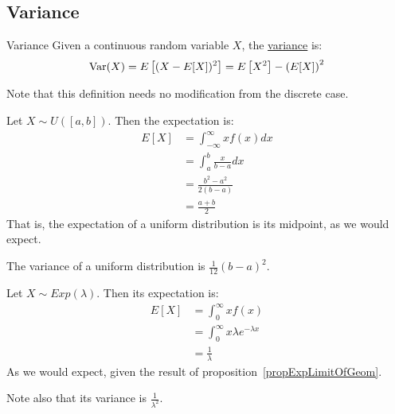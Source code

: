 \documentclass[../Main.tex]{subfiles}
\begin{document}
\subsection{Variance}
\begin{definition}{Variance}
    Given a continuous random variable $X$, the \underline{variance} is:
    \begin{equation*}
        \operatorname{Var}(X) = E\left[(X - E[X])^2\right] = E\left[X^2\right] - \left(E[X]\right)^2
    \end{equation*}
\end{definition}
\begin{remark}
    Note that this definition needs no modification from the discrete case.
\end{remark}
\begin{example}
    Let $X \sim U([a, b])$. Then the expectation is:
    \begin{align*}
        E[X] &= \int_{-\infty}^\infty xf(x) dx \\
        &= \int_a^b \frac{x}{b-a} dx \\
        &= \frac{b^2-a^2}{2(b-a)} \\
        &= \frac{a + b}{2}
    \end{align*}
    That is, the expectation of a uniform distribution is its midpoint, as we would expect.\par
    The variance of a uniform distribution is $\frac{1}{12}(b - a)^2$.
\end{example}
\begin{example}
    Let $X \sim Exp(\lambda)$. Then its expectation is:
    \begin{align*}
        E[X] &= \int_0^\infty xf(x) \\
        &= \int_0^\infty x \lambda e^{-\lambda x} \\
        &= \frac{1}{\lambda}
    \end{align*}
    As we would expect, given the result of proposition~\ref{propExpLimitOfGeom}.\par
    Note also that its variance is $\frac{1}{\lambda^2}$.
\end{example}
\end{document}
